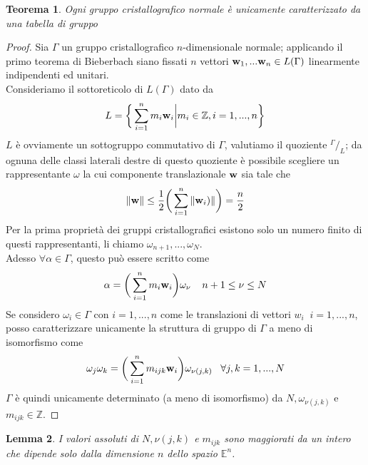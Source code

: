 \documentclass[a4paper,11pt,openright,twoside	]{book}
\newtheorem{theorem}{Teorema}[section]
\newtheorem{lemma}[theorem]{Lemma}
\newcommand*\quot[2]{{^{\textstyle #1}\big/_{\textstyle #2}}}
\begin{document}
\begin{theorem}
Ogni gruppo cristallografico normale è unicamente caratterizzato da una tabella di gruppo 
\end{theorem}

\begin{proof}
Sia $\Gamma$ un gruppo cristallografico $n$-dimensionale normale;	 applicando il primo teorema di Bieberbach siano fissati $n$ vettori $\vb{w}_1, ... \vb{w}_n \in L(\Gamma) $ linearmente indipendenti ed unitari. \\
Consideriamo il sottoreticolo  di $L(\Gamma)$ dato da 
\[ L = \bigg\{ \sum_{i = 1}^{n} m_i \vb{w}_i \bigg| m_i \in \mathbb{Z}, i = 1, ..., n \bigg\} \]
$L$ è ovviamente un sottogruppo commutativo di $\Gamma$, valutiamo il quoziente $\quot{\Gamma}{L} $; da ognuna delle classi laterali destre di questo quoziente è possibile scegliere un rappresentante $\omega$ la cui componente translazionale $\vb{w} $ sia tale che 
\[ \norm{\vb{w}} \leq \frac{1}{2} \bigg( \sum_{i = 1}^{n} \norm{ \vb{w}_i)} \bigg) = \frac{n}{2}\]  
Per la prima proprietà dei gruppi cristallografici esistono solo un numero finito di questi rappresentanti, li chiamo $\omega_{n+1}, ... , \omega_N$. \\
Adesso $\forall \alpha \in \Gamma$, questo può essere scritto come 
\[ \alpha = \bigg( \sum_{i = 1}^{n} m_i \vb{w}_i \bigg) \omega_{\nu} \; \; \; \; n+1 \leq \nu \leq N\]
Se considero $\omega_i \in \Gamma$ con $i=1, ...,n$ come le translazioni di vettori $w_i \; \; i=1, ...,n$, posso caratterizzare unicamente la struttura di gruppo di $\Gamma$ a meno di isomorfismo come 
\begin{equation} \label{eq:1}
	 \omega_j \omega_k = \bigg( \sum_{i = 1}^{n} m_{ijk} \vb{w}_i\bigg) \omega_{\nu (j,k)}      \; \; \; \forall j,k =1, ...,N 
\end{equation}
$\Gamma$  è quindi unicamente determinato (a meno di isomorfismo) da $N, \omega_{\nu (j,k)}$ e $m_{ijk} \in \mathbb{Z}$.

\end{proof}

\begin{lemma}
I valori assoluti di $N, \nu (j,k)$  e $m_{ijk}$ sono maggiorati da un intero che dipende solo dalla dimensione $n$ dello spazio $\mathbb{E}^n$.
\end{lemma}
\end{document}

